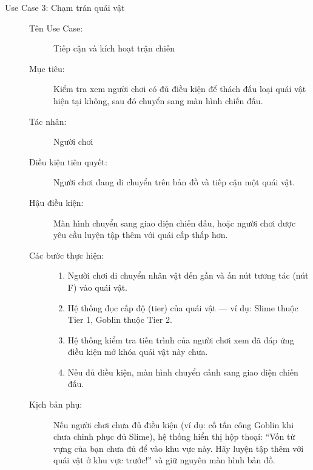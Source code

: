 \begin{description}
    \item[Use Case 3: Chạm trán quái vật] \hfill
    \begin{description}
        \item[Tên Use Case:] Tiếp cận và kích hoạt trận chiến
        \item[Mục tiêu:] Kiểm tra xem người chơi có đủ điều kiện để thách đấu loại quái vật hiện tại không, sau đó chuyển sang màn hình chiến đấu.
        \item[Tác nhân:] Người chơi
        \item[Điều kiện tiên quyết:] Người chơi đang di chuyển trên bản đồ và tiếp cận một quái vật.
        \item[Hậu điều kiện:] Màn hình chuyển sang giao diện chiến đấu, hoặc người chơi được yêu cầu luyện tập thêm với quái cấp thấp hơn.
        \item[Các bước thực hiện:] \hfill
        \begin{enumerate}
            \item Người chơi di chuyển nhân vật đến gần và ấn nút tương tác (nút F) vào quái vật.
            \item Hệ thống đọc cấp độ (tier) của quái vật --- ví dụ: Slime thuộc Tier 1, Goblin thuộc Tier 2.
            \item Hệ thống kiểm tra tiến trình của người chơi xem đã đáp ứng điều kiện mở khóa quái vật này chưa.
            \item Nếu đủ điều kiện, màn hình chuyển cảnh sang giao diện chiến đấu.
        \end{enumerate}
        \item[Kịch bản phụ:] Nếu người chơi chưa đủ điều kiện (ví dụ: cố tấn công Goblin khi chưa chinh phục đủ Slime), hệ thống hiển thị hộp thoại: ``Vốn từ vựng của bạn chưa đủ để vào khu vực này. Hãy luyện tập thêm với quái vật ở khu vực trước!'' và giữ nguyên màn hình bản đồ.
    \end{description}

    \vspace{0.3cm}


\end{description}
